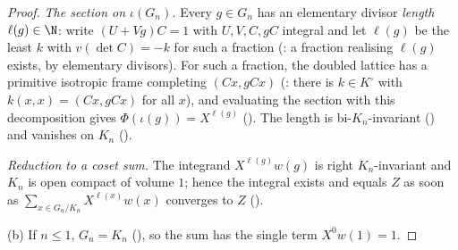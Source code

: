 \begin{proof}
\emph{The section on $\iota(G_n)$.} Every $g\in G_n$ has an elementary divisor \emph{length} $\ell(g)\in\N$: write
$(U+Vg)C=1$ with $U,V,C,gC$ integral and let $\ell(g)$ be the least $k$ with $v(\det C)=-k$ for such a fraction
(: a fraction realising $\ell(g)$ exists, by elementary
divisors). For such a fraction, the doubled lattice has a primitive isotropic frame completing $(Cx,gCx)$
(: there is $k\in K^\square$ with
$k(x,x)=(Cx,gCx)$ for all $x$), and evaluating the section with this decomposition gives $\Phi(\iota(g))=X^{\ell(g)}$
(). The length is
bi-$K_n$-invariant () and vanishes on $K_n$
().

\emph{Reduction to a coset sum.} The integrand $X^{\ell(g)}w(g)$ is right $K_n$-invariant and $K_n$ is open compact of volume
$1$; hence the integral exists and equals $Z$ as soon as $\sum_{x\in G_n/K_n}X^{\ell(x)}w(x)$ converges to $Z$
().

(b) If $n\le1$, $G_n=K_n$ (), so the sum has the single term
$X^0w(1)=1$.


\end{proof}
